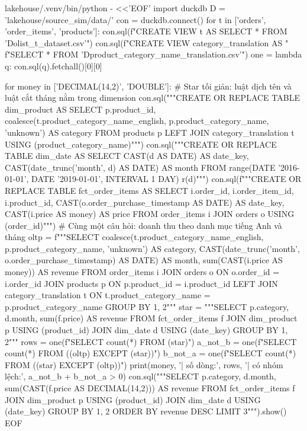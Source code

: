 \begin{codeblock}
lakehouse/.venv/bin/python - <<'EOF'
import duckdb
D = 'lakehouse/source_sim/data/'
con = duckdb.connect()
for t in ['orders', 'order_items', 'products']:
    con.sql(f"CREATE VIEW {t} AS SELECT * FROM '{D}olist_{t}_dataset.csv'")
con.sql(f"CREATE VIEW category_translation AS "
        f"SELECT * FROM '{D}product_category_name_translation.csv'")
one = lambda q: con.sql(q).fetchall()[0][0]

for money in ['DECIMAL(14,2)', 'DOUBLE']:
    # Star tối giản: luật dịch tên và luật cắt tháng nằm trong dimension
    con.sql("""CREATE OR REPLACE TABLE dim_product AS
      SELECT p.product_id, coalesce(t.product_category_name_english,
                                    p.product_category_name, 'unknown') AS category
      FROM products p
      LEFT JOIN category_translation t USING (product_category_name)""")
    con.sql("""CREATE OR REPLACE TABLE dim_date AS
      SELECT CAST(d AS DATE) AS date_key,
             CAST(date_trunc('month', d) AS DATE) AS month
      FROM range(DATE '2016-01-01', DATE '2019-01-01', INTERVAL 1 DAY) r(d)""")
    con.sql(f"""CREATE OR REPLACE TABLE fct_order_items AS
      SELECT i.order_id, i.order_item_id, i.product_id,
             CAST(o.order_purchase_timestamp AS DATE) AS date_key,
             CAST(i.price AS {money}) AS price
      FROM order_items i JOIN orders o USING (order_id)""")
    # Cùng một câu hỏi: doanh thu theo danh mục tiếng Anh và tháng
    oltp = f"""SELECT coalesce(t.product_category_name_english,
                              p.product_category_name, 'unknown') AS category,
                     CAST(date_trunc('month', o.order_purchase_timestamp) AS DATE)
                       AS month,
                     sum(CAST(i.price AS {money})) AS revenue
              FROM order_items i
              JOIN orders o ON o.order_id = i.order_id
              JOIN products p ON p.product_id = i.product_id
              LEFT JOIN category_translation t
                ON t.product_category_name = p.product_category_name
              GROUP BY 1, 2"""
    star = """SELECT p.category, d.month, sum(f.price) AS revenue
              FROM fct_order_items f
              JOIN dim_product p USING (product_id)
              JOIN dim_date d USING (date_key)
              GROUP BY 1, 2"""
    rows = one(f"SELECT count(*) FROM ({star})")
    a_not_b = one(f"SELECT count(*) FROM (({oltp}) EXCEPT ({star}))")
    b_not_a = one(f"SELECT count(*) FROM (({star}) EXCEPT ({oltp}))")
    print(money, '| số dòng:', rows, '| có nhóm lệch:', a_not_b + b_not_a > 0)
con.sql("""SELECT p.category, d.month,
                  sum(CAST(f.price AS DECIMAL(14,2))) AS revenue
           FROM fct_order_items f JOIN dim_product p USING (product_id)
           JOIN dim_date d USING (date_key)
           GROUP BY 1, 2 ORDER BY revenue DESC LIMIT 3""").show()
EOF
\end{codeblock}
